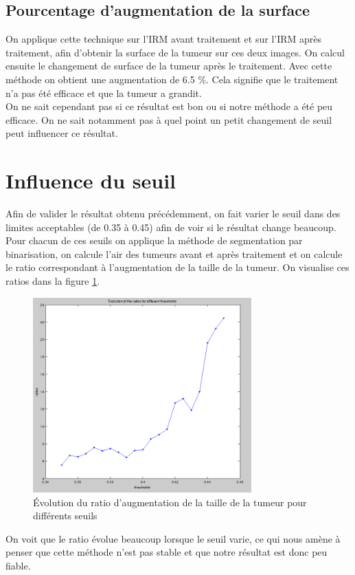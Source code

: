 
	\subsection{Pourcentage d'augmentation de la surface} %
	\label{ssub:pourcentage_d_augmentation_de_la_surface}
		On applique cette technique sur l'IRM avant traitement et sur l'IRM après traitement, afin d'obtenir la surface de la tumeur sur ces deux images. On calcul ensuite le changement de surface de la tumeur après le traitement. Avec cette méthode on obtient une augmentation de 6.5 \%. Cela signifie que le traitement n'a pas été efficace et que la tumeur a grandit.\\

		On ne sait cependant pas si ce résultat est bon ou si notre méthode a été peu efficace. On ne sait notamment pas à quel point un petit changement de seuil peut influencer ce résultat.

\section{Influence du seuil}
	Afin de valider le résultat obtenu précédemment, on fait varier le seuil dans des limites acceptables (de 0.35 à 0.45) afin de voir si le résultat change beaucoup. Pour chacun de ces seuils on applique la méthode de segmentation par binarisation, on calcule l'air des tumeurs avant et après traitement et on calcule le ratio correspondant à l’augmentation de la taille de la tumeur. On visualise ces ratios dans la figure \ref{fig:ratios_binarisation}.

	\begin{figure}[H]
		\centering
		\includegraphics[width=0.75\textwidth]{images/1-ratios.png}
		\caption{Évolution du ratio d'augmentation de la taille de la tumeur pour différents seuils}
		\label{fig:ratios_binarisation}
	\end{figure}

	On voit que le ratio évolue beaucoup lorsque le seuil varie, ce qui nous amène à penser que cette méthode n'est pas stable et que notre résultat est donc peu fiable.